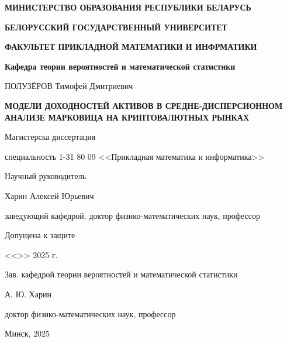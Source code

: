 \begin{titlepage}
    \begin{center}
       \textbf{МИНИСТЕРСТВО ОБРАЗОВАНИЯ РЕСПУБЛИКИ БЕЛАРУСЬ}

       \textbf{БЕЛОРУССКИЙ ГОСУДАРСТВЕННЫЙ УНИВЕРСИТЕТ}

       \textbf{ФАКУЛЬТЕТ ПРИКЛАДНОЙ МАТЕМАТИКИ И ИНФРМАТИКИ}

       \textbf{Кафедра теории вероятностей и математической статистики}
    \end{center}

    \vspace{15pt}

    \begin{center}
        ПОЛУЗЁРОВ Тимофей Дмитриевич
    \end{center}

    \begin{center}
        \textbf{МОДЕЛИ ДОХОДНОСТЕЙ АКТИВОВ В СРЕДНЕ-ДИСПЕРСИОННОМ АНАЛИЗЕ МАРКОВИЦА НА КРИПТОВАЛЮТНЫХ РЫНКАХ}
    \end{center}

    \begin{center}
        Магистерска диссертация

        специальность 1-31 80 09
        <<Прикладная математика и информатика>>
    \end{center}

    \vspace{10pt}

    \hfill
    \begin{minipage}{0.5\linewidth}
        \begin{flushleft}
            Научный руководитель
    
            Харин Алексей Юрьевич
    
            заведующий кафедрой, доктор физико-математических наук, профессор
    
        \end{flushleft}
    \end{minipage}

    \vspace{30pt}

    Допущена к защите

    <<\underline{\hspace{20pt}}>> \underline{\hspace{100pt}} 2025 г.

    Зав. кафедрой теории вероятностей и математической статистики

    \underline{\hspace{80pt}} А. Ю. Харин

    доктор физико-математических наук, профессор    

    \vspace{20pt}

    \begin{center}
        Минск, 2025
    \end{center}
\end{titlepage}
\setcounter{page}{2}